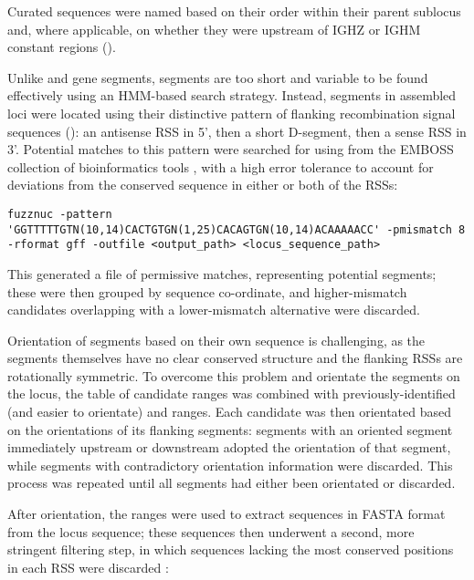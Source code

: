 Curated \jh sequences were named based on their order within their parent sublocus and, where applicable, on whether they were upstream of IGHZ or IGHM constant regions ().

\subsubsubsection{\dh}

\noindent Unlike \vh and \jh gene segments, \dh segments are too short and variable to be found effectively using an HMM-based search strategy. Instead, \dh segments in assembled loci were located using their distinctive pattern of flanking recombination signal sequences (): an antisense RSS in 5', then a short D-segment, then a sense RSS in 3'. Potential matches to this pattern were searched for using  from the EMBOSS collection of bioinformatics tools \parencite{rice2000emboss}, with a high error tolerance to account for deviations from the conserved sequence in either or both of the RSSs:

\begin{lstlisting}
fuzznuc -pattern 'GGTTTTTGTN(10,14)CACTGTGN(1,25)CACAGTGN(10,14)ACAAAAACC' -pmismatch 8 -rformat gff -outfile <output_path> <locus_sequence_path>
\end{lstlisting}

\noindent This generated a  file \parencite{stein2010generic} of permissive matches, representing potential \dh segments; these were then grouped by sequence co-ordinate, and higher-mismatch candidates overlapping with a lower-mismatch alternative were discarded.

Orientation of \dh segments based on their own sequence is challenging, as the segments themselves have no clear conserved structure and the flanking RSSs are rotationally symmetric. To overcome this problem and orientate the \dh segments on the locus, the table of \dh candidate ranges was combined with previously-identified (and easier to orientate) \vh and \jh ranges. Each \dh candidate was then orientated based on the orientations of its flanking segments: segments with an oriented segment immediately upstream or downstream adopted the orientation of that segment, while segments with contradictory orientation information were discarded. This process was repeated until all \dh segments had either been orientated or discarded.

After orientation, the \dh ranges were used to extract \dh sequences in FASTA format from the locus sequence; these sequences then underwent a second, more stringent filtering step, in which sequences lacking the most conserved positions in each RSS \parencite{hesse1989rss} were discarded \parencite{grep}:

